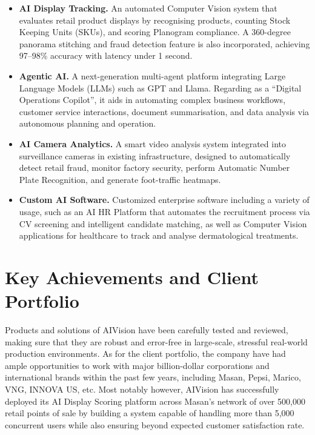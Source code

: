 \begin{itemize}
    \item \textbf{AI Display Tracking.} An automated Computer Vision system that evaluates retail product displays by recognising products, counting Stock Keeping Units (SKUs), and scoring Planogram compliance. A 360-degree panorama stitching and fraud detection feature is also incorporated, achieving 97–98\% accuracy with latency under 1 second.

    \item \textbf{Agentic AI.} A next-generation multi-agent platform integrating Large Language Models (LLMs) such as GPT and Llama. Regarding as a ``Digital Operations Copilot'', it aids in automating complex business workflows, customer service interactions, document summarisation, and data analysis via autonomous planning and operation.

    \item \textbf{AI Camera Analytics.} A smart video analysis system integrated into surveillance cameras in existing infrastructure, designed to automatically detect retail fraud, monitor factory security, perform Automatic Number Plate Recognition, and generate foot-traffic heatmaps.

    \item \textbf{Custom AI Software.} Customized enterprise software including a variety of usage, such as an AI HR Platform that automates the recruitment process via CV screening and intelligent candidate matching, as well as Computer Vision applications for healthcare to track and analyse dermatological treatments.
\end{itemize}

\section{Key Achievements and Client Portfolio}

Products and solutions of AIVision have been carefully tested and reviewed, making sure that they are robust and error-free in large-scale, stressful real-world production environments. As for the client portfolio, the company have had ample opportunities to work with major billion-dollar corporations and international brands within the past few years, including Masan, Pepsi, Marico, VNG, INNOVA US, etc. Most notably however, AIVision has successfully deployed its AI Display Scoring platform across Masan's network of over 500,000 retail points of sale by building a system capable of handling more than 5,000 concurrent users while also ensuring beyond expected customer satisfaction rate.

